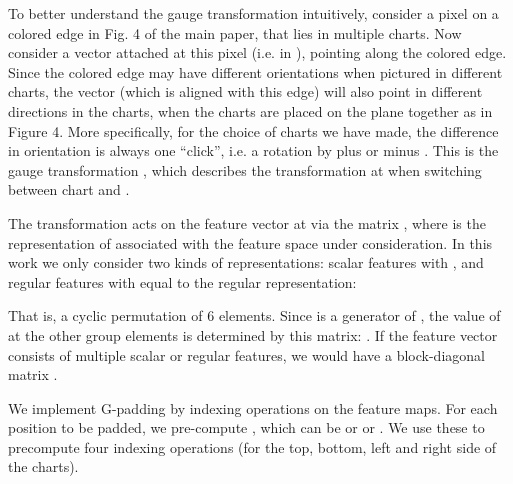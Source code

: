 \documentclass{article}
\begin{document}
To better understand the gauge transformation intuitively, consider a pixel  on a colored edge in Fig. 4 of the main paper, that lies in multiple charts. 
Now consider a vector attached at this pixel (i.e. in ), pointing along the colored edge.
Since the colored edge may have different orientations when pictured in different charts, the vector (which is aligned with this edge) will also point in different directions in the charts, when the charts are placed on the plane together as in Figure 4.
More specifically, for the choice of charts we have made, the difference in orientation is always one ``click'', i.e. a rotation by plus or minus .
This is the gauge transformation , which describes the transformation at  when switching between chart  and .

The transformation  acts on the feature vector at  via the matrix , where  is the representation of  associated with the feature space under consideration.
In this work we only consider two kinds of representations: scalar features with , and regular features with  equal to the regular representation:

That is, a cyclic permutation of 6 elements.
Since  is a generator of , the value of  at the other group elements is determined by this matrix: .
If the feature vector consists of multiple scalar or regular features, we would have a block-diagonal matrix .

We implement G-padding by indexing operations on the feature maps.
For each position  to be padded, we pre-compute , which can be  or  or .
We use these to precompute four indexing operations (for the top, bottom, left and right side of the charts).
 
\end{document}
